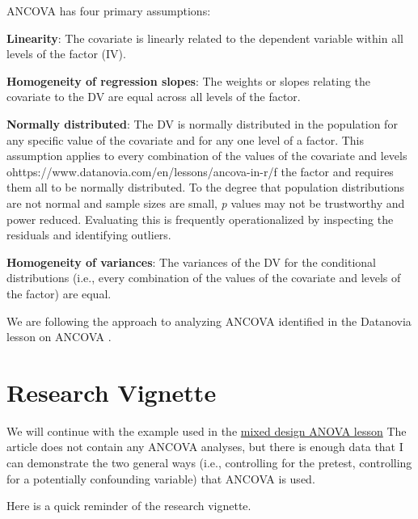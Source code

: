 \documentclass[
  11pt,
]{book}
\begin{document}
ANCOVA has four primary assumptions:

\textbf{Linearity}: The covariate is linearly related to the dependent variable within all levels of the factor (IV).

\textbf{Homogeneity of regression slopes}: The weights or slopes relating the covariate to the DV are equal across all levels of the factor.

\textbf{Normally distributed}: The DV is normally distributed in the population for any specific value of the covariate and for any one level of a factor. This assumption applies to every combination of the values of the covariate and levels ohttps://www.datanovia.com/en/lessons/ancova-in-r/f the factor and requires them all to be normally distributed. To the degree that population distributions are not normal and sample sizes are small, \emph{p} values may not be trustworthy and power reduced. Evaluating this is frequently operationalized by inspecting the residuals and identifying outliers.

\textbf{Homogeneity of variances}: The variances of the DV for the conditional distributions (i.e., every combination of the values of the covariate and levels of the factor) are equal.

We are following the approach to analyzing ANCOVA identified in the Datanovia lesson on ANCOVA \citep{datanovia_ancova_nodate}.

\hypertarget{research-vignette-8}{%
\section{Research Vignette}\label{research-vignette-8}}

We will continue with the example used in the \protect\hyperlink{Mixed}{mixed design ANOVA lesson} The article does not contain any ANCOVA analyses, but there is enough data that I can demonstrate the two general ways (i.e., controlling for the pretest, controlling for a potentially confounding variable) that ANCOVA is used.

Here is a quick reminder of the research vignette.
\end{document}
